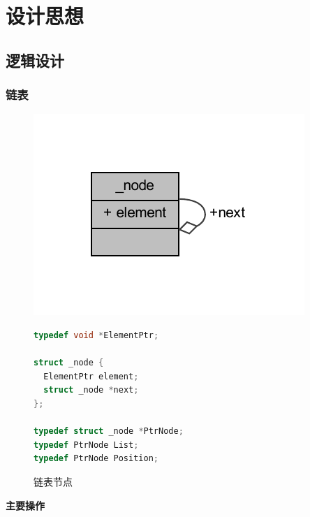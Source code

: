 \section{设计思想}
\subsection{逻辑设计}
\subsubsection{链表}

\begin{figure}[H]
    \begin{minipage}[c]{0.5\linewidth}
        \centering
        \includegraphics[width=\linewidth]{figures/struct__node}
        \caption{链表节点}
        \label{fig:structnode}
    \end{minipage}
    \begin{minipage}[c]{0.5\linewidth}
        \begin{lstlisting}[language = c]
typedef void *ElementPtr;

struct _node {
  ElementPtr element;
  struct _node *next;
};

typedef struct _node *PtrNode;
typedef PtrNode List;
typedef PtrNode Position;
        \end{lstlisting}
    \end{minipage}
\end{figure}

\textbf{主要操作}

